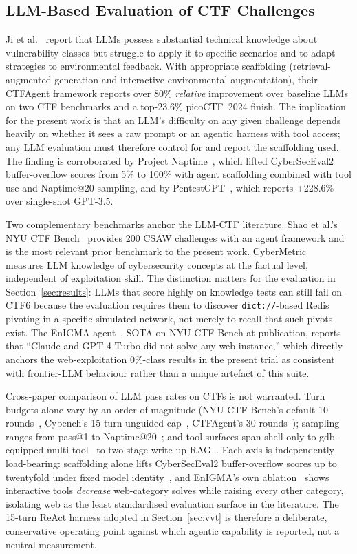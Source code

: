 \subsection{LLM-Based Evaluation of CTF Challenges}
Ji et al.~\cite{ji2025} report that LLMs possess substantial
technical knowledge about vulnerability classes but struggle
to apply it to specific scenarios and to adapt strategies to
environmental feedback. With appropriate scaffolding
(retrieval-augmented generation and interactive environmental
augmentation), their CTFAgent framework reports over 80\%
\emph{relative} improvement over baseline LLMs on two CTF
benchmarks and a top-23.6\% picoCTF~2024 finish. The
implication for the present work is that an LLM's difficulty
on any given challenge depends heavily on whether it sees a
raw prompt or an agentic harness with tool access; any LLM
evaluation must therefore control for and report the
scaffolding used. The finding is corroborated by Project
Naptime~\cite{Naptime2024}, which lifted CyberSecEval2
buffer-overflow scores from 5\% to 100\% with agent
scaffolding combined with tool use and Naptime@20 sampling,
and by PentestGPT~\cite{Deng2024PentestGPT}, which reports
+228.6\% over single-shot GPT-3.5.

Two complementary benchmarks anchor the LLM-CTF literature.
Shao et al.'s NYU CTF Bench~\cite{Shao2024} provides 200 CSAW
challenges with an agent framework and is the most relevant
prior benchmark to the present work. CyberMetric~\cite{Tihanyi2024}
measures LLM knowledge of cybersecurity concepts at the factual
level, independent of exploitation skill. The distinction matters
for the evaluation in Section~\ref{sec:results}: LLMs
that score highly on knowledge tests can still fail on CTF6
because the evaluation requires them to discover
\texttt{dict://}-based Redis pivoting in a specific simulated
network, not merely to recall that such pivots exist. The
EnIGMA agent~\cite{Abramovich2025}, SOTA on NYU CTF Bench at
publication, reports that ``Claude and GPT-4 Turbo did not
solve any web instance,'' which directly anchors the
web-exploitation 0\%-class results in the present trial as
consistent with frontier-LLM behaviour rather than a unique
artefact of this suite.

Cross-paper comparison of LLM pass rates on CTFs is not
warranted. Turn budgets alone vary by an order of magnitude
(NYU CTF Bench's default 10 rounds~\cite{Shao2024},
Cybench's 15-turn unguided cap~\cite{Zhang2024Cybench},
CTFAgent's 30 rounds~\cite{ji2025}); sampling ranges from
pass@1 to Naptime@20~\cite{Naptime2024}; and tool surfaces
span shell-only to gdb-equipped multi-tool~\cite{Abramovich2025}
to two-stage write-up RAG~\cite{ji2025}. Each axis is
independently load-bearing: scaffolding alone lifts
CyberSecEval2 buffer-overflow scores up to twentyfold under
fixed model identity~\cite{Naptime2024}, and EnIGMA's own
ablation~\cite{Abramovich2025} shows interactive tools
\emph{decrease} web-category solves while raising every
other category, isolating web as the least standardised
evaluation surface in the literature. The 15-turn ReAct
harness adopted in Section~\ref{sec:vvt} is therefore a
deliberate, conservative operating point against which
agentic capability is reported, not a neutral measurement.


